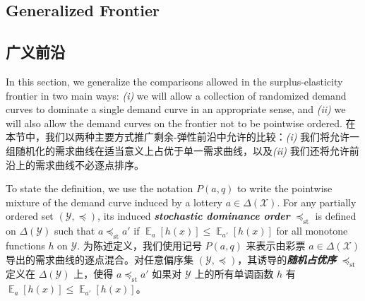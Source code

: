 \documentclass[12pt,letterpaper]{article}
\newenvironment{original}{\color{black}\noindent}{}
\newenvironment{translation}{\color{blue}\noindent}{}
\theoremstyle{plain}
\theoremstyle{definition}
\theoremstyle{remark}
\DeclareMathOperator{\E}{\mathds{E}}
\newcommand{\Y}{\mathcal{Y}}
\renewcommand{\1}{\mathds{1}}
\newcommand{\X}{\mathcal{X}}
\theoremstyle{definition}
\begin{document}
\begin{original}
\subsection{Generalized Frontier}
\end{original}
\begin{translation}
\subsection{广义前沿}
\end{translation}

\begin{original}
In this section, we generalize the comparisons allowed in the surplus-elasticity frontier in two main ways: \textit{(i)} we will allow a collection of randomized demand curves to dominate a single demand curve in an appropriate sense, and \textit{(ii)} we will also allow the demand curves on the frontier not to be pointwise ordered.
\end{original}
\begin{translation}
在本节中，我们以两种主要方式推广剩余-弹性前沿中允许的比较：\textit{(i)} 我们将允许一组随机化的需求曲线在适当意义上占优于单一需求曲线，以及\textit{(ii)} 我们还将允许前沿上的需求曲线不必逐点排序。
\end{translation}

\begin{original}
To state the definition, we use the notation $P(a, q)$ to write the pointwise mixture of the demand curve induced by a lottery $a \in \Delta(\X)$. For any partially ordered set $(\Y, \preceq)$, its induced \textit{\textbf{stochastic dominance order}} $\preceq_{\text{st}}$ is defined on $\Delta(\Y)$ such that $a \preceq_{\text{st}} a'$ if $\E_{a}[h(x)]\leq \E_{a'}[h(x)]$ for all monotone functions $h$ on $\Y$.
\end{original}
\begin{translation}
为陈述定义，我们使用记号 $P(a, q)$ 来表示由彩票 $a \in \Delta(\X)$ 导出的需求曲线的逐点混合。对任意偏序集 $(\Y, \preceq)$，其诱导的\textit{\textbf{随机占优序}} $\preceq_{\text{st}}$ 定义在 $\Delta(\Y)$ 上，使得 $a \preceq_{\text{st}} a'$ 如果对 $\Y$ 上的所有单调函数 $h$ 有 $\E_{a}[h(x)]\leq \E_{a'}[h(x)]$。
\end{translation}
\end{document}
